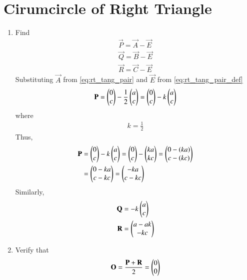 \documentclass[journal,12pt,twocolumn]{IEEEtran}
\renewcommand\thesection{\arabic{section}}
\begin{document}
\section{Cirumcircle of Right Triangle}
\begin{enumerate}[label=\thesection.\arabic*
,ref=\thesection.\theenumi]
\item Find 
\begin{align}
\label{eq:rt_triang_circum_coord}
\vec{P}=\vec{A}-\vec{E}
\\
\vec{Q}=\vec{B}-\vec{E}
\\
\vec{R}=\vec{C}-\vec{E}
\end{align}
%
\solution Substituting $\vec{A}$ from \eqref{eq:rt_tang_pair} and $\vec{E}$ from \eqref{eq:rt_tang_pair_def}
\begin{align}
\label{eq:rt_triang_circum_coord_sol}
\mathbf{P}= \begin{pmatrix}0 \\ c\end{pmatrix} - \frac{1}{2}\begin{pmatrix}a \\ c\end{pmatrix} = \begin{pmatrix}0 \\ c\end{pmatrix} - k\begin{pmatrix}a \\ c\end{pmatrix}
\end{align}
where 
\begin{align}
k = \frac{1}{2}
\end{align}
Thus, 
\begin{align}
\label{eq:rt_triang_circum_coord_sol}
\mathbf{P}&=  \begin{pmatrix}0 \\ c\end{pmatrix} - k\begin{pmatrix}a \\ c\end{pmatrix} =  \begin{pmatrix}0 \\ c\end{pmatrix} - \begin{pmatrix}ka \\ kc\end{pmatrix}  =  \begin{pmatrix}0-(ka) \\ c - (kc)\end{pmatrix} 
\\
& =  \begin{pmatrix}0-ka \\ c - kc\end{pmatrix} = \begin{pmatrix}-ka \\ c-kc\end{pmatrix} 
\end{align}
Similarly,
\begin{align}
\mathbf{Q}&=-k\begin{pmatrix}a \\ c\end{pmatrix}
\\
\mathbf{R}&=\begin{pmatrix}a-ak \\ -kc\end{pmatrix}
\end{align}
\item Verify that 
\begin{align}
\label{eq:rt_triang_orig}
\mathbf{O}=\frac{\mathbf{P}+\mathbf{R}}{2}=\begin{pmatrix}0 \\0\end{pmatrix}
\end{align}
%
\solution 
\begin{align}

\end{align}
\end{enumerate}
\end{document}
